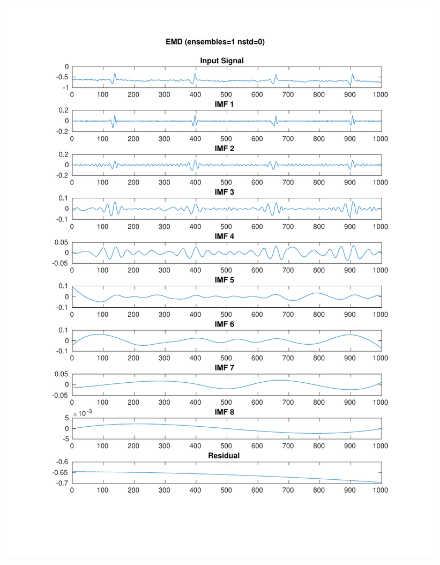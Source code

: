 \documentclass[11pt,a4paper]{article}
\begin{document}
\begin{figure}[H]
\centering
\begin{minipage}{0.48\textwidth}
	\centering
	\includegraphics[width=\textwidth]{fig/112l2_emd.pdf}
	

\end{minipage}
\end{figure}
\end{document}

